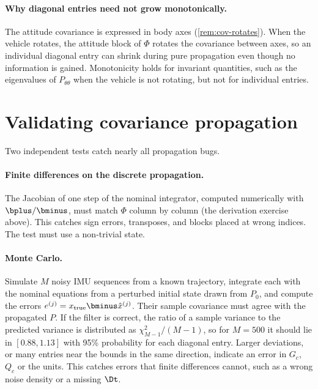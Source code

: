 \paragraph{Why diagonal entries need not grow monotonically.} The attitude covariance is expressed in body axes
(\cref{rem:cov-rotates}). When the vehicle rotates, the attitude block of $\Phi$ rotates the covariance between axes, so an
individual diagonal entry can shrink during pure propagation even though no information is gained. Monotonicity
holds for invariant quantities, such as the eigenvalues of $P_{\theta\theta}$ when the vehicle is not rotating, but not for
individual entries.

\section{Validating covariance propagation}

Two independent tests catch nearly all propagation bugs.

\paragraph{Finite differences on the discrete propagation.} The Jacobian of one step of the nominal integrator,
computed numerically with $\bplus/\bminus$, must match $\Phi$ column by column (the derivation exercise above). This
catches sign errors, transposes, and blocks placed at wrong indices. The test must use a non-trivial state.

\paragraph{Monte Carlo.} Simulate $M$ noisy IMU sequences from a known trajectory, integrate each with the nominal
equations from a perturbed initial state drawn from $P_0$, and compute the errors
$e^{(j)} = x_{\text{true}}\bminus\hat x^{(j)}$. Their sample covariance must agree with the propagated $P$. If the filter is
correct, the ratio of a sample variance to the predicted variance is distributed as $\chi^2_{M-1}/(M-1)$, so for
$M = 500$ it should lie in $[0.88, 1.13]$ with 95\% probability for each diagonal entry. Larger deviations, or many
entries near the bounds in the same direction, indicate an error in $G_c$, $Q_c$ or the units. This catches errors
that finite differences cannot, such as a wrong noise density or a missing $\Dt$.

